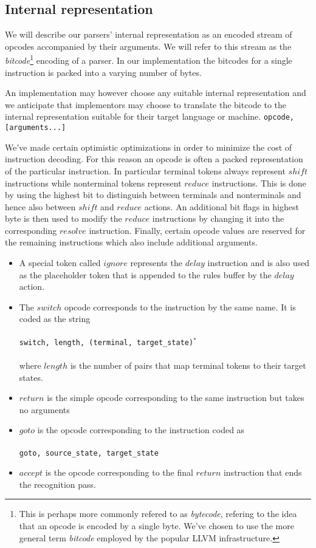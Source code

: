 \documentclass[a4paper,11pt]{article}
\begin{document}
\subsection{Internal representation}
We will describe our parsers' internal representation as an encoded stream of opcodes accompanied by their arguments. 
We will refer to this stream as the \emph{bitcode}\footnote{This is perhaps more commonly refered to as \emph{bytecode}, refering to the idea that an opcode is encoded by a single byte. We've chosen to use the more general term \emph{bitcode} employed by the popular LLVM infrastructure.} encoding of a parser.
In our implementation the bitcodes for a single instruction is packed into a varying number of bytes.

An implementation may however choose any suitable internal representation and we anticipate that implementors may choose to translate the bitcode to the internal representation suitable for their target language or machine.
\texttt{opcode, [arguments...]}

We've made certain optimistic optimizations in order to minimize the cost of instruction decoding. 
For this reason an opcode is often a packed representation of the particular instruction.
In particular terminal tokens always represent $shift$ instructions while nonterminal tokens represent $reduce$ instructions.
This is done by using the highest bit to distinguish between terminals and nonterminals and hence also between $shift$ and $reduce$ actions.
An additional bit flags in highest byte is then used to modify the  $reduce$ instructions by changing it into the corresponding $resolve$ instruction.
Finally, certain opcode values are reserved for the remaining instructions which also include additional arguments.

\begin{itemize}
\item A special token called $ignore$ represents the $delay$ instruction and is also used as the placeholder token that is appended to the rules buffer by the $delay$ action.
\item The $switch$ opcode corresponds to the instruction by the same name. It is coded as the string\\\\
      \texttt{switch, length, (terminal, target\_state)}$^\texttt{*}$\\\\
      where $length$ is the number of pairs that map terminal tokens to their target states.
\item $return$ is the simple opcode corresponding to the same instruction but takes no arguments
\item $goto$ is the opcode corresponding to the instruction coded as\\\\
      \texttt{goto, source\_state, target\_state}\\
\item $accept$ is the opcode corresponding to the final $return$ instruction that ends the recognition pass.
\end{itemize}
\end{document}
